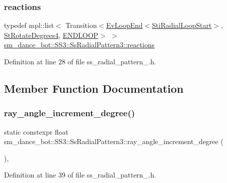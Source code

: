 \subsubsection{\texorpdfstring{reactions}{reactions}}
{\footnotesize\ttfamily typedef mpl\+::list$<$ Transition$<$\hyperlink{structsmacc_1_1default__events_1_1EvLoopEnd}{Ev\+Loop\+End}$<$\hyperlink{structsm__dance__bot_1_1radial__motion__states_1_1StiRadialLoopStart}{Sti\+Radial\+Loop\+Start}$>$, \hyperlink{structsm__dance__bot_1_1StRotateDegrees4}{St\+Rotate\+Degrees4}, \hyperlink{structsmacc_1_1default__transition__tags_1_1ENDLOOP}{E\+N\+D\+L\+O\+OP}$>$ $>$ \hyperlink{structsm__dance__bot_1_1SS3_1_1SsRadialPattern3_aa427cf1c1d77bc04e23acf4fb4bef9f1}{sm\+\_\+dance\+\_\+bot\+::\+S\+S3\+::\+Ss\+Radial\+Pattern3\+::reactions}}



Definition at line 28 of file ss\+\_\+radial\+\_\+pattern\+\_.\+h.



\subsection{Member Function Documentation}
\mbox{\label{structsm__dance__bot_1_1SS3_1_1SsRadialPattern3_a904170764306e3c9242b9cd66e44b56e}} 
\subsubsection{\texorpdfstring{ray\+\_\+angle\+\_\+increment\+\_\+degree()}{ray\_angle\_increment\_degree()}}
{\footnotesize\ttfamily static constexpr float sm\+\_\+dance\+\_\+bot\+::\+S\+S3\+::\+Ss\+Radial\+Pattern3\+::ray\+\_\+angle\+\_\+increment\+\_\+degree (\begin{DoxyParamCaption}{ }\end{DoxyParamCaption})\hspace{0.3cm}{\ttfamily [inline]}, {\ttfamily [static]}}



Definition at line 39 of file ss\+\_\+radial\+\_\+pattern\+\_.\+h.


